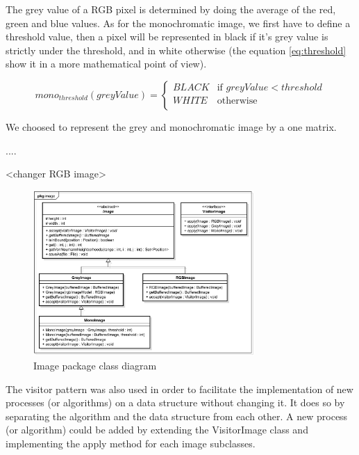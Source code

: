 The grey value of a RGB pixel is determined by doing the average of the red, green and blue values. As for the monochromatic image, we first have to define a 
threshold value, then a pixel will be represented in black if it's grey value is strictly under the threshold, and in white otherwise (the equation \ref{eq:threshold} show it in a more mathematical point of view).


\begin{equation} \label{eq:threshold}
mono_{threshold}(greyValue) = 
\begin{cases}
	BLACK & \text{if } greyValue < threshold\\
	WHITE & \text{otherwise} \\ 
\end{cases}
\end{equation}


We choosed to represent the grey and monochromatic image by a one matrix. 


.... 



<changer RGB image> 

\begin{figure}
	\centering 
	\includegraphics[width=0.75\textwidth]{images/diagrams/class_diagram_image}
	\caption{Image package class diagram}
	\label{fig:diagram:class:image}
\end{figure}


The visitor pattern was also used in order to facilitate the implementation of new processes (or algorithms) on a data structure without changing it. It does so by separating the algorithm and the data structure from each other. A new process (or algorithm) could be added by extending the VisitorImage class and implementing the apply method for each image subclasses. 

